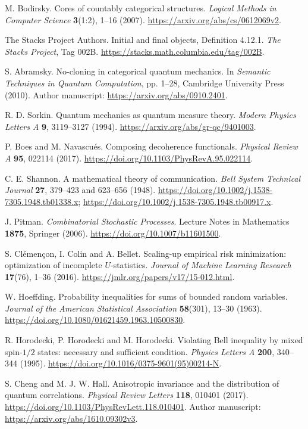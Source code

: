 M. Bodirsky. Cores of countably categorical structures.
\emph{Logical Methods in Computer Science} \textbf{3}(1:2), 1--16 (2007).
\url{https://arxiv.org/abs/cs/0612069v2}.

The Stacks Project Authors. Initial and final objects, Definition 4.12.1.
\emph{The Stacks Project}, Tag 002B.
\url{https://stacks.math.columbia.edu/tag/002B}.

S. Abramsky. No-cloning in categorical quantum mechanics.
In \emph{Semantic Techniques in Quantum Computation}, pp. 1--28,
Cambridge University Press (2010).
Author manuscript: \url{https://arxiv.org/abs/0910.2401}.

R. D. Sorkin. Quantum mechanics as quantum measure theory.
\emph{Modern Physics Letters A} \textbf{9}, 3119--3127 (1994).
\url{https://arxiv.org/abs/gr-qc/9401003}.

P. Boes and M. Navascu\'es. Composing decoherence functionals.
\emph{Physical Review A} \textbf{95}, 022114 (2017).
\url{https://doi.org/10.1103/PhysRevA.95.022114}.

C. E. Shannon. A mathematical theory of communication.
\emph{Bell System Technical Journal} \textbf{27}, 379--423 and 623--656 (1948).
\url{https://doi.org/10.1002/j.1538-7305.1948.tb01338.x};
\url{https://doi.org/10.1002/j.1538-7305.1948.tb00917.x}.

J. Pitman. \emph{Combinatorial Stochastic Processes}.
Lecture Notes in Mathematics \textbf{1875}, Springer (2006).
\url{https://doi.org/10.1007/b11601500}.

S. Cl\'emen\c{c}on, I. Colin and A. Bellet.
Scaling-up empirical risk minimization: optimization of incomplete $U$-statistics.
\emph{Journal of Machine Learning Research} \textbf{17}(76), 1--36 (2016).
\url{https://jmlr.org/papers/v17/15-012.html}.

W. Hoeffding. Probability inequalities for sums of bounded random variables.
\emph{Journal of the American Statistical Association} \textbf{58}(301), 13--30 (1963).
\url{https://doi.org/10.1080/01621459.1963.10500830}.

R. Horodecki, P. Horodecki and M. Horodecki.
Violating Bell inequality by mixed spin-$1/2$ states: necessary and sufficient condition.
\emph{Physics Letters A} \textbf{200}, 340--344 (1995).
\url{https://doi.org/10.1016/0375-9601(95)00214-N}.

S. Cheng and M. J. W. Hall.
Anisotropic invariance and the distribution of quantum correlations.
\emph{Physical Review Letters} \textbf{118}, 010401 (2017).
\url{https://doi.org/10.1103/PhysRevLett.118.010401}.
Author manuscript: \url{https://arxiv.org/abs/1610.09302v3}.

